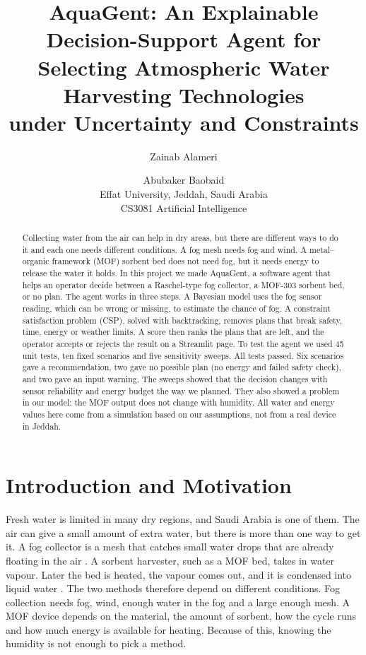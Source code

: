\documentclass[11pt]{article}
\title{AquaGent: An Explainable Decision-Support Agent for\\Selecting Atmospheric Water Harvesting Technologies\\under Uncertainty and Constraints}
\author{Zainab Alameri \and Abubaker Baobaid \\
  Effat University, Jeddah, Saudi Arabia \\
  CS3081 Artificial Intelligence}
\begin{document}
\maketitle

\begin{abstract}
Collecting water from the air can help in dry areas, but there are different ways to do it and each one needs different conditions. A fog mesh needs fog and wind. A metal--organic framework (MOF) sorbent bed does not need fog, but it needs energy to release the water it holds. In this project we made AquaGent, a software agent that helps an operator decide between a Raschel-type fog collector, a MOF-303 sorbent bed, or no plan. The agent works in three steps. A Bayesian model uses the fog sensor reading, which can be wrong or missing, to estimate the chance of fog. A constraint satisfaction problem (CSP), solved with backtracking, removes plans that break safety, time, energy or weather limits. A score then ranks the plans that are left, and the operator accepts or rejects the result on a Streamlit page. To test the agent we used 45 unit tests, ten fixed scenarios and five sensitivity sweeps. All tests passed. Six scenarios gave a recommendation, two gave no possible plan (no energy and failed safety check), and two gave an input warning. The sweeps showed that the decision changes with sensor reliability and energy budget the way we planned. They also showed a problem in our model: the MOF output does not change with humidity. All water and energy values here come from a simulation based on our assumptions, not from a real device in Jeddah.
\end{abstract}

\section{Introduction and Motivation}

Fresh water is limited in many dry regions, and Saudi Arabia is one of them. The air can give a small amount of extra water, but there is more than one way to get it. A fog collector is a mesh that catches small water drops that are already floating in the air \citep{schemenauer1994standard}. A sorbent harvester, such as a MOF bed, takes in water vapour. Later the bed is heated, the vapour comes out, and it is condensed into liquid water \citep{song2023mof}. The two methods therefore depend on different conditions. Fog collection needs fog, wind, enough water in the fog and a large enough mesh. A MOF device depends on the material, the amount of sorbent, how the cycle runs and how much energy is available for heating. Because of this, knowing the humidity is not enough to pick a method.
\end{document}
